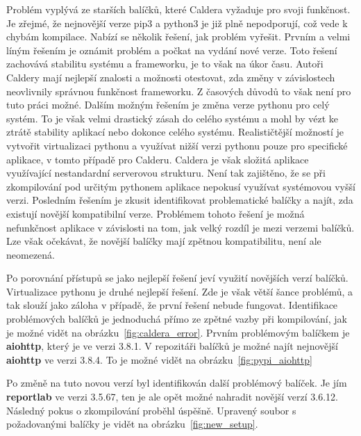 
Problém vyplývá ze starších balíčků, které Caldera vyžaduje pro svoji funkčnost.
Je zřejmé, že nejnovější verze pip3 a python3 je již plně nepodporují, což vede k chybám kompilace.
Nabízí se několik řešení, jak problém vyřešit.
Prvním a velmi líným řešením je oznámit problém a počkat na vydání nové verze.
Toto řešení zachovává stabilitu systému a frameworku, je to však na úkor času.
Autoři Caldery mají nejlepší znalosti a možnosti otestovat, zda změny v závislostech neovlivnily správnou funkčnost frameworku.
Z časových důvodů to však není pro tuto práci možné.
Dalším možným řešením je změna verze pythonu pro celý systém.
To je však velmi drastický zásah do celého systému a mohl by vézt ke ztrátě stability aplikací nebo dokonce celého systému.
Realističtější možností je vytvořit virtualizaci pythonu a využívat nižší verzi pythonu pouze pro specifické aplikace, v tomto případě pro Calderu.
Caldera je však složitá aplikace využívající nestandardní serverovou strukturu.
Není tak zajištěno, že se při zkompilování pod určitým pythonem aplikace nepokusí využívat systémovou vyšší verzi.
Posledním řešením je zkusit identifikovat problematické balíčky a najít, zda existují novější kompatibilní verze.
Problémem tohoto řešení je možná nefunkčnost aplikace v závislosti na tom, jak velký rozdíl je mezi verzemi balíčků.
Lze však očekávat, že novější balíčky mají zpětnou kompatibilitu, není ale neomezená.

Po porovnání přístupů se jako nejlepší řešení jeví využití novějších verzí balíčků.
Virtualizace pythonu je druhé nejlepší řešení.
Zde je však větší šance problémů, a tak slouží jako záloha v případě, že první řešení nebude fungovat.
Identifikace problémových balíčků je jednoduchá přímo ze zpětné vazby při kompilování, jak je možné vidět na obrázku~\ref{fig:caldera_error}.
Prvním problémovým balíčkem je \textbf{aiohttp}, který je ve verzi 3.8.1.
V repozitáři balíčků je možné najít nejnovější \textbf{aiohttp} ve verzi 3.8.4.
To je možné vidět na obrázku~\ref{fig:pypi_aiohttp}


Po změně na tuto novou verzí byl identifikován další problémový balíček.
Je jím \textbf{reportlab} ve verzi 3.5.67, ten je ale opět možné nahradit novější verzí 3.6.12.
Následný pokus o zkompilování proběhl úspěšně.
Upravený soubor s požadovanými balíčky je vidět na obrázku~\ref{fig:new_setup}.

